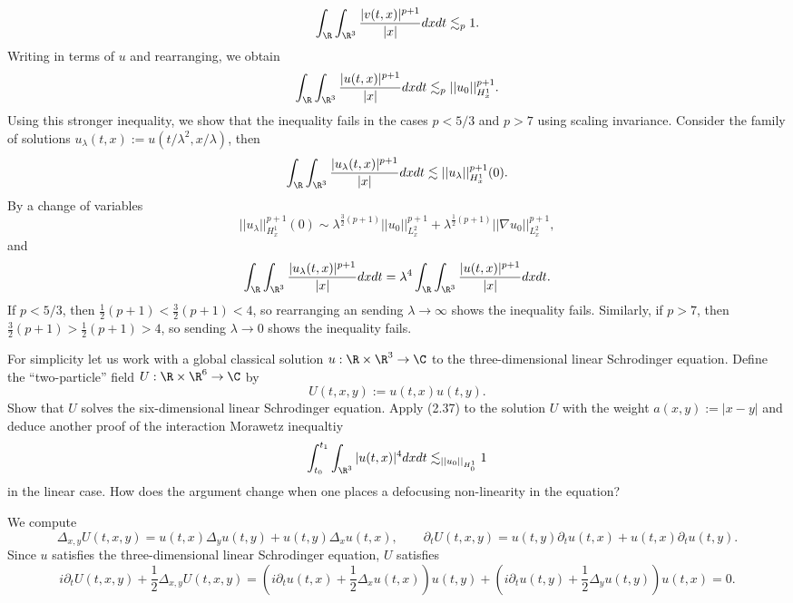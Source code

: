 \begin{solution}
		\[ \int_\R \int_{\R^3} \frac{|v(t, x)|^{p + 1}}{|x|} dx dt \lesssim_{p} 1. \]
	Writing in terms of $u$ and rearranging, we obtain
		\[ \int_\R \int_{\R^3} \frac{|u(t, x)|^{p + 1}}{|x|} dx dt \lesssim_{p} ||u_0||_{H^1_x}^{p + 1}. \]
	Using this stronger inequality, we show that the inequality fails in the cases $p < 5/3$ and $p > 7$ using scaling invariance. Consider the family of solutions $u_\lambda (t, x) := u(t/\lambda^2, x/\lambda)$, then 
		\[ \int_{\R} \int_{\R^3} \frac{|u_\lambda (t, x)|^{p + 1}}{|x|} dx dt  \lesssim ||u_\lambda||_{H^1_x}^{p + 1} (0). \]
	By a change of variables
		\[ ||u_\lambda ||_{H^1_x}^{p + 1} (0) \sim \lambda^{\frac32 (p + 1)} ||u_0 ||_{L^2_x}^{p + 1} + \lambda^{\frac12 (p + 1)} ||\nabla u_0 ||_{L_x^2}^{p + 1},\]
	and
		\[ \int_{\R} \int_{\R^3} \frac{|u_\lambda (t, x)|^{p + 1}}{|x|} dx dt = \lambda^4 \int_\R \int_{\R^3} \frac{|u(t, x)|^{p + 1}}{|x|} dx dt. \]		
	If $p < 5/3$, then $\tfrac12 (p + 1) < \tfrac32 (p + 1) < 4$, so rearranging an sending $\lambda \to \infty$ shows the inequality fails. Similarly, if $p > 7$, then $\tfrac32 (p + 1) > \tfrac12 (p + 1) > 4$, so sending $\lambda \to 0$ shows the inequality fails. 
\end{solution}

\begin{statement}
	For simplicity let us work with a global classical solution $u : \R \times \R^3 \to \C$ to the three-dimensional linear Schrodinger equation. Define the ``two-particle'' field $U: \R \times \R^6 \to \C$ by 
		\[ U(t, x, y) := u(t, x) u(t, y). \]
	Show that $U$ solves the six-dimensional linear Schrodinger equation. Apply (2.37) to the solution $U$ with the weight $a(x, y) := |x - y|$ and deduce another proof of the interaction Morawetz inequaltiy
		\[ \int_{t_0}^{t_1} \int_{\R^3} |u(t, x)|^4 dx dt \lesssim_{||u_0||_{H^1_0}} 1\]
	in the linear case. How does the argument change when one places a defocusing non-linearity in the equation?	
\end{statement}

\begin{solution}
	We compute
		\[ \Delta_{x, y} U (t, x ,y) = u(t, x) \Delta_y u(t, y) + u(t, y) \Delta_x u(t, x), \qquad \partial_t U (t, x, y) = u(t, y) \partial_t u (t, x) + u(t, x) \partial_t u(t, y). \]
	Since $u$ satisfies the three-dimensional linear Schrodinger equation, $U$ satisfies
		\[ i\partial_t U(t, x, y) + \frac12 \Delta_{x, y} U (t, x, y) = \left( i \partial_t u(t, x) + \frac12 \Delta_x u(t, x) \right) u(t, y) + \left( i \partial_t u(t, y) + \frac12 \Delta_y u(t, y) \right) u(t, x) = 0. \]	
		
\end{solution}

